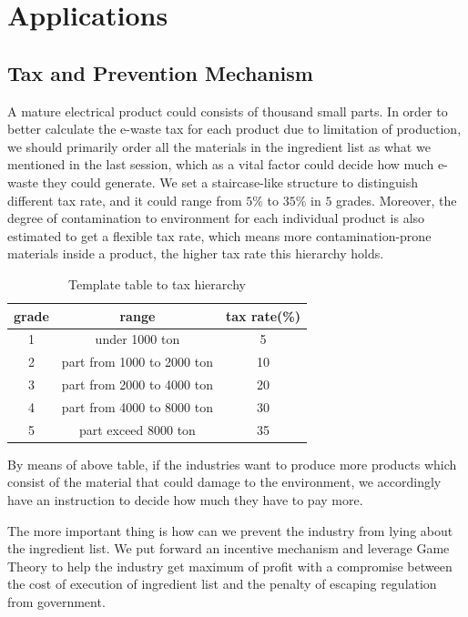 \section{Applications}

\subsection{Tax and Prevention Mechanism}

A mature electrical product could consists of thousand small parts. In order to better 
calculate the e-waste tax for each product due to limitation of production, we should primarily order all the materials 
in the ingredient list as what we mentioned in the last session, which as a vital factor could decide how much e-waste they could generate. 
We set a staircase-like structure to distinguish different tax rate, and it could range from $5\%$ to $35\%$ in $5$ grades.
Moreover, the degree of contamination to environment for each individual product is also estimated to get a flexible tax rate, 
which means more contamination-prone materials inside a product, the higher tax rate this hierarchy holds.

\begin{center}
\begin{table}
\begin{tabular}{ccc}
	\toprule
	grade	& range 					& tax rate(\%)\\
	\midrule
	1		& under 1000 ton 			& 5 \\
	2		& part from 1000 to 2000 ton & 10 \\
	3		& part from 2000 to 4000 ton & 20 \\
	4		& part from 4000 to 8000 ton & 30 \\
	5		& part exceed 8000 ton & 35 \\
	\bottomrule
\end{tabular}
\caption{Template table to tax hierarchy}
\label{table:1}
\end{table}
\end{center}

By means of above table, if the industries want to produce more products which consist of the material that could damage to the environment, we accordingly have an instruction 
to decide how much they have to pay more. 

The more important thing is how can we prevent the industry from lying about the ingredient list. 
We put forward an incentive mechanism and leverage Game Theory to help the industry get maximum of profit with a compromise between the cost of execution of ingredient list and the penalty 
of escaping regulation from government.

